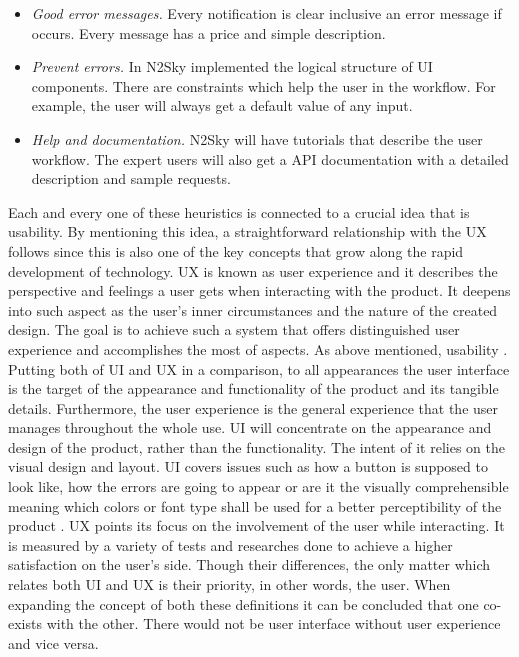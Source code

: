 \begin{itemize}
\item \emph{Good error messages.} Every notification is clear inclusive an error message if occurs. Every message has a price and simple description.
\item \emph{Prevent errors.} In N2Sky implemented the logical structure of UI components. There are constraints which help the user in the workflow. For example, the user will always get a default value of any input.
\item \emph{Help and documentation.} N2Sky will have tutorials that describe the user workflow. The expert users will also get a API documentation with a detailed description and sample requests. 

\end{itemize}

Each and every one of these heuristics is connected to a crucial idea that is usability. By mentioning this idea, a straightforward relationship with the UX follows since this is also one of the key concepts that grow along the rapid development of technology. UX is known as user experience and it describes the perspective and feelings a user gets when interacting with the product. It deepens into such aspect as the user's inner circumstances and the nature of the created design. The goal is to achieve such a system that offers distinguished user experience and accomplishes the most of aspects. As above mentioned, usability \cite{uixagenda}.
Putting both of UI and UX in a comparison, to all appearances the user interface is the target of the appearance and functionality of the product and its tangible details.  Furthermore, the user experience is the general experience that the user manages throughout the whole use. 
UI will concentrate on the appearance and design of the product, rather than the functionality. The intent of it relies on the visual design and layout. UI covers issues such as how a button is supposed to look like, how the errors are going to appear or are it the visually comprehensible meaning which colors or font type shall be used for a better perceptibility of the product \cite{humanpc}. 
UX points its focus on the involvement of the user while interacting. It is measured by a variety of tests and researches done to achieve a higher satisfaction on the user's side.
Though their differences, the only matter which relates both UI and UX is their priority, in other words, the user. When expanding the concept of both these definitions it can be concluded that one co-exists with the other. There would not be user interface without user experience and vice versa. 


